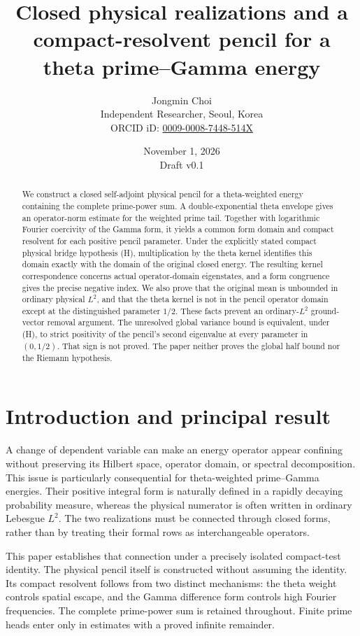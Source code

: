 \documentclass[11pt,a4paper]{article}
\title{Closed physical realizations and a compact-resolvent pencil for a theta prime--Gamma energy}
\author{Jongmin Choi\\[3pt]\small Independent Researcher, Seoul, Korea\\\small ORCID iD: \href{https://orcid.org/0009-0008-7448-514X}{0009-0008-7448-514X}}
\date{November 1, 2026\\[3pt]\small Draft v0.1}
\numberwithin{equation}{section}
\theoremstyle{definition}
\theoremstyle{remark}
\begin{document}
\maketitle
\begin{abstract}
We construct a closed self-adjoint physical pencil for a theta-weighted energy containing the complete prime-power sum. A double-exponential theta envelope gives an operator-norm estimate for the weighted prime tail. Together with logarithmic Fourier coercivity of the Gamma form, it yields a common form domain and compact resolvent for each positive pencil parameter. Under the explicitly stated compact physical bridge hypothesis \textup{(H)}, multiplication by the theta kernel identifies this domain exactly with the domain of the original closed energy. The resulting kernel correspondence concerns actual operator-domain eigenstates, and a form congruence gives the precise negative index. We also prove that the original mean is unbounded in ordinary physical $L^2$, and that the theta kernel is not in the pencil operator domain except at the distinguished parameter $1/2$. These facts prevent an ordinary-$L^2$ ground-vector removal argument. The unresolved global variance bound is equivalent, under \textup{(H)}, to strict positivity of the pencil's second eigenvalue at every parameter in $(0,1/2)$. That sign is not proved. The paper neither proves the global half bound nor the Riemann hypothesis.
\end{abstract}

\section{Introduction and principal result}

A change of dependent variable can make an energy operator appear confining without preserving its Hilbert space, operator domain, or spectral decomposition. This issue is particularly consequential for theta-weighted prime--Gamma energies. Their positive integral form is naturally defined in a rapidly decaying probability measure, whereas the physical numerator is often written in ordinary Lebesgue $L^2$. The two realizations must be connected through closed forms, rather than by treating their formal rows as interchangeable operators.

This paper establishes that connection under a precisely isolated compact-test identity. The physical pencil itself is constructed without assuming the identity. Its compact resolvent follows from two distinct mechanisms: the theta weight controls spatial escape, and the Gamma difference form controls high Fourier frequencies. The complete prime-power sum is retained throughout. Finite prime heads enter only in estimates with a proved infinite remainder.
\end{document}
